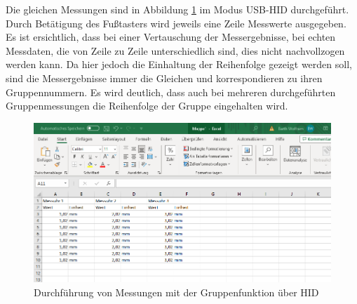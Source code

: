 Die gleichen Messungen sind in Abbildung \ref{fig:MessungenGruppenfunktionHID} im Modus \ac{USB}-\ac{HID} durchgeführt. Durch Betätigung des Fußtasters wird jeweils eine Zeile Messwerte ausgegeben. Es ist ersichtlich, dass bei einer Vertauschung der Messergebnisse, bei echten Messdaten, die von Zeile zu Zeile unterschiedlich sind, dies nicht nachvollzogen werden kann. Da hier jedoch die Einhaltung der Reihenfolge gezeigt werden soll, sind die Messergebnisse immer die Gleichen und korrespondieren zu ihren Gruppennummern. Es wird deutlich, dass auch bei mehreren durchgeführten Gruppenmessungen die Reihenfolge der Gruppe eingehalten wird.
\begin{figure}[H] 
	\centering
	\includegraphics[width=\textwidth]{figures/USBHIDGroup.png}
	\caption{Durchführung von Messungen mit der Gruppenfunktion über HID}
	\label{fig:MessungenGruppenfunktionHID}
\end{figure}

